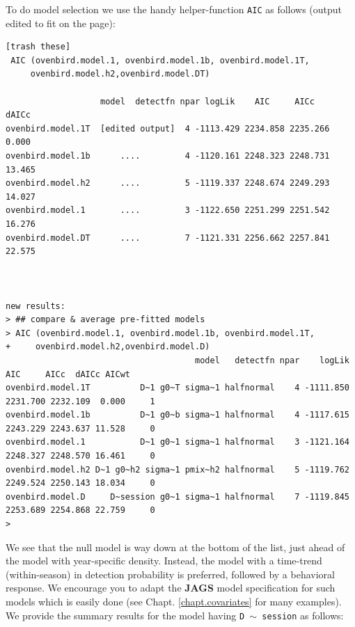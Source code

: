 To do model selection  we use the handy helper-function \mbox{\tt AIC}
as follows (output edited to fit on the page):
{\small
\begin{verbatim}
[trash these]
 AIC (ovenbird.model.1, ovenbird.model.1b, ovenbird.model.1T,
     ovenbird.model.h2,ovenbird.model.DT)

                   model  detectfn npar logLik    AIC     AICc     dAICc 
ovenbird.model.1T  [edited output]  4 -1113.429 2234.858 2235.266  0.000 
ovenbird.model.1b      ....         4 -1120.161 2248.323 2248.731 13.465 
ovenbird.model.h2      ....         5 -1119.337 2248.674 2249.293 14.027 
ovenbird.model.1       ....         3 -1122.650 2251.299 2251.542 16.276 
ovenbird.model.DT      ....         7 -1121.331 2256.662 2257.841 22.575 



new results: 
> ## compare & average pre-fitted models
> AIC (ovenbird.model.1, ovenbird.model.1b, ovenbird.model.1T,
+     ovenbird.model.h2,ovenbird.model.D)
                                      model   detectfn npar    logLik      AIC     AICc  dAICc AICwt
ovenbird.model.1T          D~1 g0~T sigma~1 halfnormal    4 -1111.850 2231.700 2232.109  0.000     1
ovenbird.model.1b          D~1 g0~b sigma~1 halfnormal    4 -1117.615 2243.229 2243.637 11.528     0
ovenbird.model.1           D~1 g0~1 sigma~1 halfnormal    3 -1121.164 2248.327 2248.570 16.461     0
ovenbird.model.h2 D~1 g0~h2 sigma~1 pmix~h2 halfnormal    5 -1119.762 2249.524 2250.143 18.034     0
ovenbird.model.D     D~session g0~1 sigma~1 halfnormal    7 -1119.845 2253.689 2254.868 22.759     0
> 

\end{verbatim}
}
We see that the null model is way down at the bottom of the list, just
ahead of the model 
with year-specific density. Instead, 
the model with a time-trend (within-season) in detection probability
is preferred, followed by a behavioral response. We encourage you to
adapt the {\bf JAGS} model specification for such models which is easily
done (see Chapt. \ref{chapt.covariates} for many examples).
We provide the summary results for the model having \mbox{\tt D $\sim$
  session} as follows:
